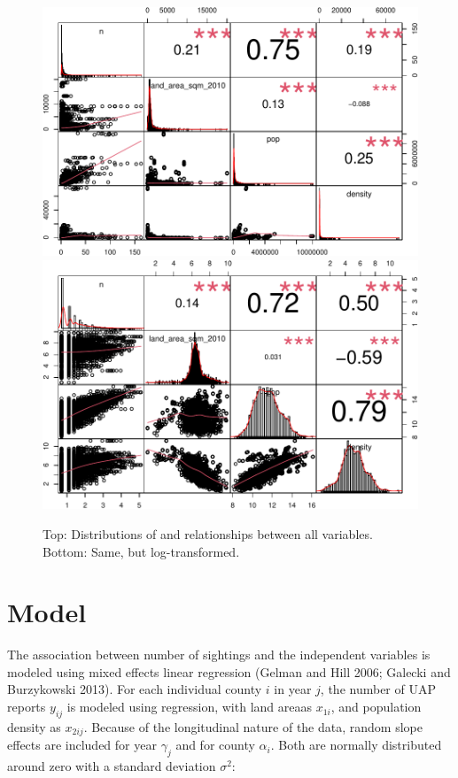 \documentclass[]{elsarticle} %
\begin{document}
\begin{figure}

{\centering \includegraphics[width=1\linewidth]{lmm_paper_files/figure-latex/unnamed-chunk-6-1} \includegraphics[width=1\linewidth]{lmm_paper_files/figure-latex/unnamed-chunk-6-2} 

}

\caption{Top: Distributions of and relationships between all variables. Bottom: Same, but log-transformed.}\label{fig:unnamed-chunk-6}
\end{figure}

\hypertarget{model}{%
\section{Model}\label{model}}

The association between number of sightings and the independent
variables is modeled using mixed effects linear regression (Gelman and
Hill 2006; Galecki and Burzykowski 2013). For each individual county
\(i\) in year \(j\), the number of UAP reports \(y_{ij}\) is modeled
using regression, with land areaas \(x_{1i}\), and population density as
\(x_{2ij}\). Because of the longitudinal nature of the data, random
slope effects are included for year \(\gamma_j\) and for county
\(\alpha_i\). Both are normally distributed around zero with a standard
deviation \(\sigma^2\):
\end{document}
